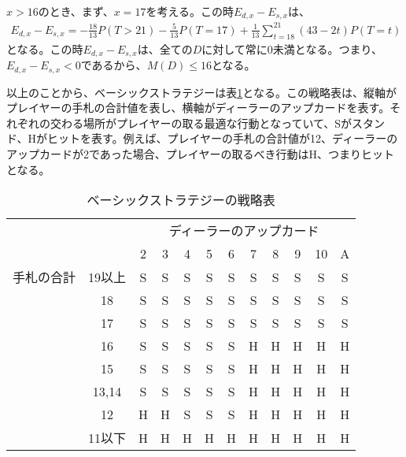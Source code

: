         \subsubsection{}
            $x>16$のとき、まず、$x=17$を考える。この時$E_{d,x}-E_{s,x}$は、
            \begin{displaymath}
                \begin{split}
                    E_{d,x}-E_{s,x}=-\frac{18}{13}P(T>21)-\frac{5}{13}P(T=17)+\frac{1}{13}\sum_{t=18}^{21}(43-2t)P(T=t)
                \end{split}
            \end{displaymath}
            となる。この時$E_{d,x}-E_{s,x}$は、全ての$D$に対して常に0未満となる。つまり、$E_{d,x}-E_{s,x}<0$であるから、$M(D)\leq 16$となる。
        
        以上のことから、ベーシックストラテジーは表\ref{kihonsenryaku}となる。この戦略表は、縦軸がプレイヤーの手札の合計値を表し、横軸がディーラーのアップカードを表す。それぞれの交わる場所がプレイヤーの取る最適な行動となっていて、Sがスタンド、Hがヒットを表す。例えば、プレイヤーの手札の合計値が12、ディーラーのアップカードが2であった場合、プレイヤーの取るべき行動はH、つまりヒットとなる。
        \begin{table}[H]
            \begin{center}
            \caption{ベーシックストラテジーの戦略表}
            \label{kihonsenryaku}
            \begin{tabular}{|lc|c|c|c|c|c|c|c|c|c|c|}
                \hline
                                            &       & \multicolumn{10}{c|}{ディーラーのアップカード}     \\ \cline{3-12} 
                                            &       & 2 & 3 & 4 & 5 & 6 & 7 & 8 & 9 & 10 & A \\ \hline
                \multicolumn{1}{|l|}{手札の合計} & 19以上  & S & S & S & S & S & S & S & S & S  & S \\ \cline{2-12} 
                \multicolumn{1}{|l|}{}      & 18    & S & S & S & S & S & S & S & S & S  & S \\ \cline{2-12} 
                \multicolumn{1}{|l|}{}      & 17    & S & S & S & S & S & S & S & S & S  & S \\ \cline{2-12} 
                \multicolumn{1}{|l|}{}      & 16    & S & S & S & S & S & H & H & H & H  & H \\ \cline{2-12} 
                \multicolumn{1}{|l|}{}      & 15    & S & S & S & S & S & H & H & H & H  & H \\ \cline{2-12} 
                \multicolumn{1}{|l|}{}      & 13,14 & S & S & S & S & S & H & H & H & H  & H \\ \cline{2-12} 
                \multicolumn{1}{|l|}{}      & 12    & H & H & S & S & S & H & H & H & H  & H \\ \cline{2-12} 
                \multicolumn{1}{|l|}{}      & 11以下  & H & H & H & H & H & H & H & H & H  & H \\ \hline
                \end{tabular}
            \end{center}
            \end{table}
    
